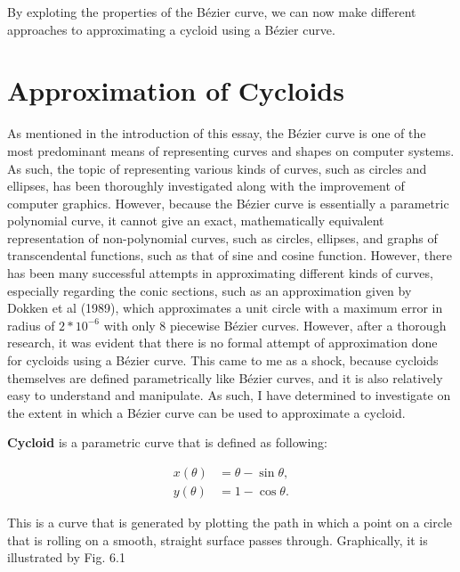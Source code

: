 \documentclass[11pt, oneside, appendixprefix=Appendix]{article}
\theoremstyle{definition}
\numberwithin{figure}{section}
\begin{document}
By exploting the properties of the B\'ezier curve, we can now make different approaches to approximating a cycloid using a B\'ezier curve.

\section{Approximation of Cycloids}

As mentioned in the introduction of this essay, the B\'ezier curve is one of the most predominant means of representing curves and shapes on computer systems. As such, the topic of representing various kinds of curves, such as circles and ellipses, has been thoroughly investigated along with the improvement of computer graphics. However, because the B\'ezier curve is essentially a parametric polynomial curve, it cannot give an exact, mathematically equivalent representation of non-polynomial curves, such as circles, ellipses, and graphs of transcendental functions, such as that of sine and cosine function. However, there has been many successful attempts in approximating different kinds of curves, especially regarding the conic sections, such as an approximation given by Dokken et al (1989), which approximates a unit circle with a maximum error in radius of $2*10^{-6}$ with only 8 piecewise B\'ezier curves. However, after a thorough research, it was evident that there is no formal attempt of approximation done for cycloids using a B\'ezier curve. This came to me as a shock, because cycloids themselves are defined parametrically like B\'ezier curves, and it is also relatively easy to understand and manipulate. As such, I have determined to investigate on the extent in which a B\'ezier curve can be used to approximate a cycloid.

\textbf{Cycloid} is a parametric curve that is defined as following:

\begin{equation}
\begin{split}
x(\theta) & = \theta - \sin \theta, \\
y(\theta) & = 1 - \cos \theta.
\end{split}
\end{equation}

This is a curve that is generated by plotting the path in which a point on a circle that is rolling on a smooth, straight surface passes through. Graphically, it is illustrated by Fig. 6.1
\end{document}
